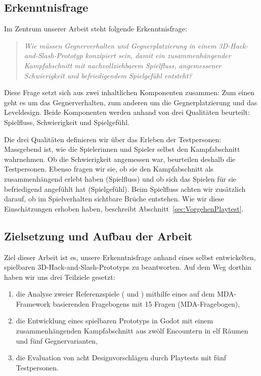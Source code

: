 \documentclass[../Main.tex]{subfiles}
\begin{document}
\subsection{Erkenntnisfrage} \label{sec:Erkenntnisfrage}

Im Zentrum unserer Arbeit steht folgende Erkenntnisfrage:

\vspace{\baselineskip}

\begin{quote}
    \textit{Wie müssen Gegnerverhalten und Gegnerplatzierung in einem 3D-Hack-and-Slash-Prototyp konzipiert sein, damit ein zusammenhängender Kampfabschnitt mit nachvollziehbarem Spielfluss, angemessener Schwierigkeit und befriedigendem Spielgefühl entsteht?}
\end{quote}

\vspace{\baselineskip}

Diese Frage setzt sich aus zwei inhaltlichen Komponenten zusammen: Zum einen geht es um das Gegnerverhalten, zum anderen um die Gegnerplatzierung und das Leveldesign. Beide Komponenten werden anhand von drei Qualitäten beurteilt: Spielfluss, Schwierigkeit und Spielgefühl.

Die drei Qualitäten definieren wir über das Erleben der Testpersonen: Massgebend ist, wie die Spielerinnen und Spieler selbst den Kampfabschnitt wahrnehmen. Ob die Schwierigkeit angemessen war, beurteilen deshalb die Testpersonen. Ebenso fragen wir sie, ob sie den Kampfabschnitt als zusammenhängend erlebt haben (Spielfluss) und ob sich das Spielen für sie befriedigend angefühlt hat (Spielgefühl). Beim Spielfluss achten wir zusätzlich darauf, ob im Spielverhalten sichtbare Brüche entstehen. Wie wir diese Einschätzungen erhoben haben, beschreibt Abschnitt~\ref{sec:VorgehenPlaytest}.

\subsection{Zielsetzung und Aufbau der Arbeit} \label{sec:Aufbau}

Ziel dieser Arbeit ist es, unsere Erkenntnisfrage anhand eines selbst entwickelten, spielbaren 3D-Hack-and-Slash-Prototyps zu beantworten. Auf dem Weg dorthin haben wir uns drei Teilziele gesetzt:

\begin{enumerate}
    \item die Analyse zweier Referenzspiele ( und ) mithilfe eines auf dem MDA-Framework basierenden Fragebogens mit 15 Fragen (MDA-Fragebogen),
    \item die Entwicklung eines spielbaren Prototyps in Godot mit einem zusammenhängenden Kampfabschnitt aus zwölf Encountern in elf Räumen und fünf Gegnervarianten,
    \item die Evaluation von acht Designvorschlägen durch Playtests mit fünf Testpersonen.
\end{enumerate}
\end{document}
